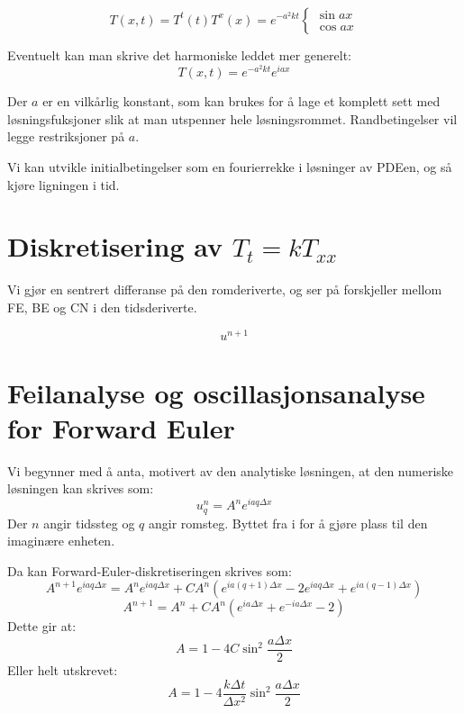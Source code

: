 \documentclass[a4paper, 10pt]{article}
\begin{document}
\begin{equation}
	T(x,t) = T^t(t)T^x(x) = e^{-a^2kt} \begin{cases} \sin{a x} \\ \cos{a x}\end{cases}
\end{equation}

Eventuelt kan man skrive det harmoniske leddet mer generelt:
\begin{equation}
	T(x, t) = e^{-a^2 kt} e^{iax}
\end{equation}

Der $a$ er en vilkårlig konstant, som kan brukes for å lage et komplett sett med løsningsfuksjoner slik at man utspenner hele løsningsrommet. Randbetingelser vil legge restriksjoner på $a$. 

Vi kan utvikle initialbetingelser som en fourierrekke i løsninger av PDEen, og så kjøre ligningen i tid. 

\section{Diskretisering av $T_t = kT_{xx}$}
Vi gjør en sentrert differanse på den romderiverte, og ser på forskjeller mellom FE, BE og CN i den tidsderiverte. 

\begin{equation}
	u^{n+1}
\end{equation}

\section{Feilanalyse og oscillasjonsanalyse for Forward Euler}
Vi begynner med å anta, motivert av den analytiske løsningen, at den numeriske løsningen kan skrives som:
\begin{equation}
	u^n_q = A^ne^{iaq\Delta x}
\end{equation}
Der $n$ angir tidssteg og $q$ angir romsteg. Byttet fra i for å gjøre plass til den imaginære enheten. 

Da kan Forward-Euler-diskretiseringen skrives som:
\begin{equation}
	A^{n+1}e^{iaq\Delta x} = A^ne^{iaq\Delta x} + CA^n(e^{ia(q+1)\Delta x}-2e^{iaq\Delta x} + e^{ia(q-1)\Delta x})
\end{equation}
\begin{equation}
	A^{n+1} = A^n +CA^n(e^{ia\Delta x} + e^{-ia\Delta x} - 2)
\end{equation}
Dette gir at:
\begin{equation}
	A = 1 - 4C\sin^2{\frac{a\Delta x}{2}}
\end{equation}
Eller helt utskrevet:
\begin{equation}
	A = 1 - 4\frac{k\Delta t}{\Delta x^2}\sin^2{\frac{a\Delta x}{2}}
\end{equation}
\end{document}
